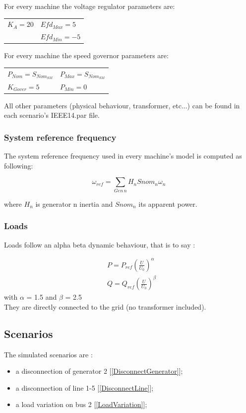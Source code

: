 \documentclass[a4paper, 12pt]{report}
\begin{document}
For every machine the voltage regulator parameters are:
\begin{center}
\begin{tabular}{l|l}
   $K_A=20$ & $Efd_{Max}=5$  \\
    & $Efd_{Min}=-5$   \\
\end{tabular}
\end{center}

For every machine the speed governor parameters are:
\begin{center}
\begin{tabular}{l|l}
   $P_{Nom}=S_{Nom_{SM}}$ & $P_{Max}=S_{Nom_{SM}}$  \\
   $K_{Gover}=5$ & $P_{Min}=0$   \\
\end{tabular}
\end{center}

All other parameters (physical behaviour, transformer, etc...) can be found in each scenario's IEEE14.par file.

\subsubsection{System reference frequency}

The system reference frequency used in every machine's model is computed as following:

\[
 \omega_{ref} = \sum_{Gen \hspace{2pt} n} H_{n} Snom_{n} \omega_{n}
\]

where $H_{n}$ is generator n inertia and $Snom_{n}$ its apparent power.
\subsubsection{Loads}

Loads follow an alpha beta dynamic behaviour, that is to say :

\[
\begin{aligned}
& P = P_{ref} (\frac{U}{U_{0}})^\alpha \\
& Q = Q_{ref} (\frac{U}{U_{0}})^\beta
\end{aligned}
\]
with $\alpha$ = 1.5 and $\beta$ = 2.5 \\
They are directly connected to the grid (no transformer included).


\subsection{Scenarios}
The simulated scenarios are :
\begin{itemize}
\item a disconnection of generator 2 [\ref{DisconnectGenerator}];
\item a disconnection of line 1-5 [\ref{DisconnectLine}];
\item a load variation on bus 2 [\ref{LoadVariation}];
\end{itemize}
\end{document}
